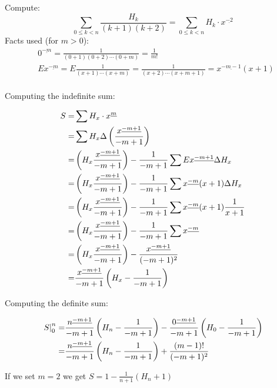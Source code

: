 \documentclass[a4paper,10pt,fleqn]{article}
\begin{document}
\newcommand{\ffac}[1]{%
  x^{\underline{#1}}%
}
\newcommand{\ffact}[2]{%
  {#1}^{\underline{#2}}%
}
\noindent Compute:
{\setlength{\mathindent}{0cm}
\begin{equation*}
\sum_{0\leq k <n} \frac{H_k}{(k+1)(k+2)} = \sum_{0\leq k <n} H_k \cdot \ffac{-2} 
\end{equation*}
}
\noindent Facts used (for $m>0$):
\begin{align*}
& \ffact{0}{-m} =\frac{1}{(0+1)(0+2)\cdots(0+m)} = \frac{1}{m!} \\
& E \ffac{-m} = E \frac{1}{(x+1)\cdots(x+m)} = \frac{1}{(x+2)\cdots (x+m+1)} = \ffac{-m-1} (x+1)\\
\end{align*}

Computing the indefinite sum:

\begin{align*}
S = & \sum H_x \cdot x^{\underline{m}} \\
= & \sum H_x \Delta \left( \frac{ \ffac{-m+1} }{-m+1} \right) \\
= & \left(H_x \frac{ \ffac{-m+1} }{-m+1}\right) - \frac{1}{-m+1} \sum E \ffac{-m+1} \Delta H_x \\
= & \left(H_x \frac{ \ffac{-m+1} }{-m+1}\right) - \frac{1}{-m+1} \sum \ffac{-m} (x+1) \Delta H_x \\
= & \left(H_x \frac{ \ffac{-m+1} }{-m+1}\right) - \frac{1}{-m+1} \sum \ffac{-m} (x+1) \frac{1}{x+1} \\
= & \left(H_x \frac{ \ffac{-m+1} }{-m+1}\right) - \frac{1}{-m+1} \sum \ffac{-m} \\
= & \left(H_x \frac{ \ffac{-m+1} }{-m+1}\right) - \frac{ \ffac{-m+1} }{(-m+1)^2} \\
= & \frac{\ffac{-m+1}}{-m+1} \left( H_x - \frac{1}{-m+1} \right) \\
\end{align*}

Computing the definite sum:

\begin{align*}
\left.S\right|_0^n = & \frac{\ffact{n}{-m+1}}{-m+1} \left( H_n - \frac{1}{-m+1} \right) - \frac{\ffact{0}{-m+1}}{-m+1} \left( H_0 - \frac{1}{-m+1} \right) \\
 = & \frac{\ffact{n}{-m+1}}{-m+1} \left( H_n - \frac{1}{-m+1} \right) + \frac{(m-1)!}{(-m+1)^2} \\
\end{align*}

If we set $m=2$ we get $ S = 1 - \frac{1}{n+1} \left( H_n + 1 \right) $
\end{document}
